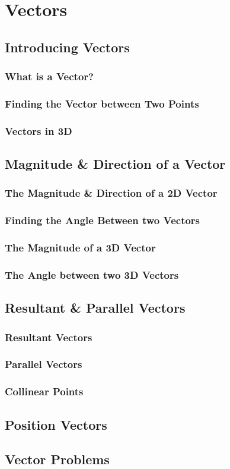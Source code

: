 \documentclass[../alevelmaths.tex]{subfiles}
\begin{document}
\chapter{Vectors}
\section{Introducing Vectors}
\subsection*{What is a Vector?}
\subsection*{Finding the Vector between Two Points}
\subsection*{Vectors in 3D}
\section{Magnitude \& Direction of a Vector}
\subsection*{The Magnitude \& Direction of a 2D Vector}
\subsection*{Finding the Angle Between two Vectors}
\subsection*{The Magnitude of a 3D Vector}
\subsection*{The Angle between two 3D Vectors}
\section{Resultant \& Parallel Vectors}
\subsection*{Resultant Vectors}
\subsection*{Parallel Vectors}
\subsection*{Collinear Points}
\section{Position Vectors}
\section{Vector Problems}
\end{document}
